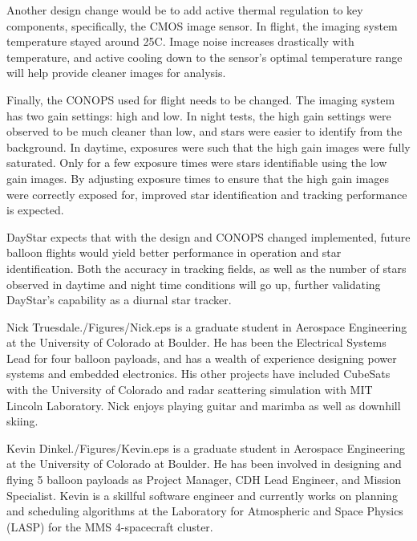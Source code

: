 \documentclass[twocolumn,letterpaper]{IEEEAerospace2012}
\newcommand{\rootdir}{./Figures/}
\begin{document}
Another design change would be to add active thermal regulation to key components, specifically, the CMOS image sensor. In flight, the imaging system temperature stayed around 25C. Image noise increases drastically with temperature, and active cooling down to the sensor's optimal temperature range will help provide cleaner images for analysis.

Finally, the CONOPS used for flight needs to be changed. The imaging system has two gain settings: high and low. In night tests, the high gain settings were observed to be much cleaner than low, and stars were easier to identify from the background. In daytime, exposures were such that the high gain images were fully saturated. Only for a few exposure times were stars identifiable using the low gain images. By adjusting exposure times to ensure that the high gain images were correctly exposed for, improved star identification and tracking performance is expected.

DayStar expects that with the design and CONOPS changed implemented, future balloon flights would yield better performance in operation and star identification. Both the accuracy in tracking fields, as well as the number of stars observed in daytime and night time conditions will go up, further validating DayStar's capability as a diurnal star tracker.




\thebiography
\begin{biographywithpic}{Nick Truesdale}{\rootdir Nick.eps}
is a graduate student in Aerospace Engineering at the University of Colorado at Boulder.
He has been the Electrical Systems Lead for four balloon payloads, and has a wealth of experience designing power systems and embedded electronics. His other projects have included CubeSats with the University of Colorado and radar scattering simulation with MIT Lincoln Laboratory. Nick enjoys playing guitar and marimba as well as downhill skiing.
\end{biographywithpic}

\begin{biographywithpic} {Kevin Dinkel}{\rootdir Kevin.eps}
is a graduate student in Aerospace Engineering at the University of Colorado at Boulder. He has been involved in designing and flying 5 balloon payloads as Project Manager, CDH Lead Engineer, and Mission Specialist. Kevin is a skillful software engineer and currently works on planning and scheduling algorithms at the Laboratory for Atmospheric and Space Physics (LASP) for the MMS 4-spacecraft cluster.
\end{biographywithpic}
\end{document}
